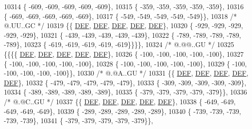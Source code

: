 \begin{DoxyCode}
10314 \{ -609, -609, -609, -609, -609\},
10315 \{ -359, -359, -359, -359, -359\},
10316 \{ -669, -669, -669, -669, -669\},
10317 \{ -549, -549, -549, -549, -549\}\},
10318 \textcolor{comment}{/*  @.UU..GC */}
10319 \{\{  \mbox{\hyperlink{1_88_84__epars_8h_a397419fc12b37ed479c8abb9d444d843}{DEF}},  \mbox{\hyperlink{1_88_84__epars_8h_a397419fc12b37ed479c8abb9d444d843}{DEF}},  \mbox{\hyperlink{1_88_84__epars_8h_a397419fc12b37ed479c8abb9d444d843}{DEF}},  \mbox{\hyperlink{1_88_84__epars_8h_a397419fc12b37ed479c8abb9d444d843}{DEF}},  \mbox{\hyperlink{1_88_84__epars_8h_a397419fc12b37ed479c8abb9d444d843}{DEF}}\},
10320 \{ -929, -929, -929, -929, -929\},
10321 \{ -439, -439, -439, -439, -439\},
10322 \{ -789, -789, -789, -789, -789\},
10323 \{ -619, -619, -619, -619, -619\}\}\}\},
10324 \textcolor{comment}{/*  @.@@..GU */}
10325 \{\{\{\{  \mbox{\hyperlink{1_88_84__epars_8h_a397419fc12b37ed479c8abb9d444d843}{DEF}},  \mbox{\hyperlink{1_88_84__epars_8h_a397419fc12b37ed479c8abb9d444d843}{DEF}},  \mbox{\hyperlink{1_88_84__epars_8h_a397419fc12b37ed479c8abb9d444d843}{DEF}},  \mbox{\hyperlink{1_88_84__epars_8h_a397419fc12b37ed479c8abb9d444d843}{DEF}},  \mbox{\hyperlink{1_88_84__epars_8h_a397419fc12b37ed479c8abb9d444d843}{DEF}}\},
10326 \{ -100, -100, -100, -100, -100\},
10327 \{ -100, -100, -100, -100, -100\},
10328 \{ -100, -100, -100, -100, -100\},
10329 \{ -100, -100, -100, -100, -100\}\},
10330 \textcolor{comment}{/*  @.@A..GU */}
10331 \{\{  \mbox{\hyperlink{1_88_84__epars_8h_a397419fc12b37ed479c8abb9d444d843}{DEF}},  \mbox{\hyperlink{1_88_84__epars_8h_a397419fc12b37ed479c8abb9d444d843}{DEF}},  \mbox{\hyperlink{1_88_84__epars_8h_a397419fc12b37ed479c8abb9d444d843}{DEF}},  \mbox{\hyperlink{1_88_84__epars_8h_a397419fc12b37ed479c8abb9d444d843}{DEF}},  \mbox{\hyperlink{1_88_84__epars_8h_a397419fc12b37ed479c8abb9d444d843}{DEF}}\},
10332 \{ -479, -479, -479, -479, -479\},
10333 \{ -309, -309, -309, -309, -309\},
10334 \{ -389, -389, -389, -389, -389\},
10335 \{ -379, -379, -379, -379, -379\}\},
10336 \textcolor{comment}{/*  @.@C..GU */}
10337 \{\{  \mbox{\hyperlink{1_88_84__epars_8h_a397419fc12b37ed479c8abb9d444d843}{DEF}},  \mbox{\hyperlink{1_88_84__epars_8h_a397419fc12b37ed479c8abb9d444d843}{DEF}},  \mbox{\hyperlink{1_88_84__epars_8h_a397419fc12b37ed479c8abb9d444d843}{DEF}},  \mbox{\hyperlink{1_88_84__epars_8h_a397419fc12b37ed479c8abb9d444d843}{DEF}},  \mbox{\hyperlink{1_88_84__epars_8h_a397419fc12b37ed479c8abb9d444d843}{DEF}}\},
10338 \{ -649, -649, -649, -649, -649\},
10339 \{ -289, -289, -289, -289, -289\},
10340 \{ -739, -739, -739, -739, -739\},
10341 \{ -379, -379, -379, -379, -379\}\},

\end{DoxyCode}

